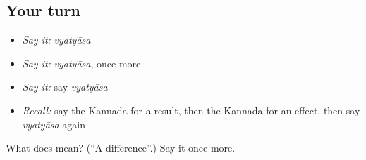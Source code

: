 \subsection*{Your turn}
\begin{itemize}
\raggedright
  \item \emph{Say it:} \emph{vyatyāsa}
  \item \emph{Say it:} \emph{vyatyāsa}, once more
  \item \emph{Say it:} say \emph{vyatyāsa}
  \item \emph{Recall:} say the Kannada for a result, then the Kannada for an effect, then say \emph{vyatyāsa} again
\end{itemize}

\begin{tcolorbox}[breakable,colback=teal!4,colframe=teal!35!black,title={Before you move on}]
What does  mean? (\textquotedblleft{}A difference\textquotedblright{}.) Say it once more.
\end{tcolorbox}
